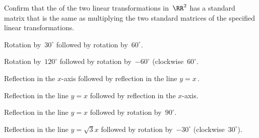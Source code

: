 \begin{exercise} \label{ex:} 
Confirm that the  of the two linear transformations in~\(\RR^2\) has a standard matrix that is the same as multiplying the two standard matrices of the specified linear transformations.

\begin{parts}
\item Rotation by~\(30^\circ\) followed by rotation by~\(60^\circ\).

\item Rotation by~\(120^\circ\) followed by rotation by~\(-60^\circ\) (clockwise~\(60^\circ\).

\item Reflection in the \(x\)-axis followed by reflection in the line \(y=x\)\,.

\item Reflection in the line \(y=x\) followed by reflection in the \(x\)-axis.

\item Reflection in the line \(y=x\) followed by rotation by~\(90^\circ\).

\item Reflection in the line \(y=\sqrt3x\) followed by rotation by~\(-30^\circ\) (clockwise~\(30^\circ\)).

\end{parts}
\end{exercise}




